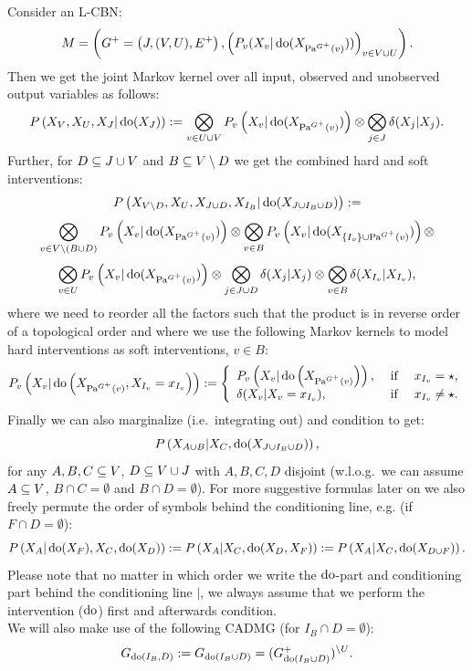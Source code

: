 \begin{Rem}[Recap]
    \label{rem-bcn-notation}
    Consider an L-CBN:
    \[M= \left ( G^+=\left ( J,(V,U),E^+ \right ), \left ( P_v ( X_v|\operatorname{do}( X_{\mathrm{Pa}^{G^+}(v)})) \right )_{v \in V \cup U} \right ).  \]
        Then we get the joint  Markov kernel over all input, observed and unobserved output variables as follows:
        \[ P\left ( X_V,X_U,X_J|\operatorname{do}(X_J) \right ) := \bigotimes_{v \in U \cup V} P_v\left ( X_v|\operatorname{do}(X_{\mathrm{Pa}^{G^+}(v)})\right ) \otimes 
        \bigotimes_{j \in J} \delta(X_j|X_j).\]
    Further, for $D \subseteq J \cup V$ and $B \subseteq V \setminus D$ we get the combined hard and soft interventions:
    \[ P\left ( X_{V \setminus D},X_U,X_{J \cup D},X_{I_B}| \operatorname{do}(X_{J \cup I_B \cup D}) \right ) :=\] 
    \[    \bigotimes_{v \in V \setminus (B \cup D)} P_v\left ( X_v|\operatorname{do}(X_{\mathrm{Pa}^{G^+}(v)})\right ) \otimes 
    \bigotimes_{v \in B} P_v\left ( X_v|\operatorname{do}(X_{\{I_v\}\cup\mathrm{Pa}^{G^+}(v)})\right ) \otimes \]
     \[   \bigotimes_{v \in U} P_v\left ( X_v|\operatorname{do}(X_{\mathrm{Pa}^{G^+}(v)})\right ) \otimes 
     \bigotimes_{j \in J \cup D} \delta(X_j|X_j) \otimes\bigotimes_{v \in B} \delta(X_{I_v}|X_{I_v})  ,\]
       where we need to reorder all the factors such that the product is in reverse order of a topological order and 
       where we use the following Markov kernels to model hard interventions as  soft interventions, $v\in B$: 
       \[ P_v\left ( X_v|\operatorname{do}\left ( X_{\mathrm{Pa}^{G^+}(v)},X_{I_v}=x_{I_v}\right )\right ) := 
         \left\{ \begin{array}{lll}
                 P_v\left ( X_v|\operatorname{do}\left ( X_{\mathrm{Pa}^{G^+}(v)}\right )\right ), & \text{ if } & x_{I_v} = \star, \\
    \delta(X_v|X_v =x_{I_v}),  & \text{ if } & x_{I_v} \neq \star. 
                \end{array}\right.\]
  Finally we can also marginalize (i.e.\ integrating out) and condition to get: 
  \[ P\left ( X_{A\cup B}|X_C, \operatorname{do}(X_{J \cup I_B \cup D}) \right ) ,\]
  for any $A,B,C \subseteq V$, $D \subseteq V \cup J$ with $A,B,C,D$ disjoint (w.l.o.g.\ we can assume $A \subseteq V$, $B \cap C = \emptyset$ and $B \cap D = \emptyset$).
For more suggestive formulas later on we also freely permute the order of symbols behind the conditioning line, e.g. (if $F \cap D = \emptyset$):
\[ P\left ( X_A|\operatorname{do}(X_F),X_C, \operatorname{do}(X_D) \right ) := P\left ( X_A|X_C, \operatorname{do}(X_D,X_F) \right ) := P\left ( X_A|X_C, \operatorname{do}(X_{D\cup F}) \right ).\]
Please note that no matter in which order we write the $\operatorname{do}$-part and conditioning part behind the conditioning line $|$, we always assume that we perform the intervention ($\operatorname{do}$) first and afterwards condition.\\
We will also make use of the following CADMG (for $I_B \cap D = \emptyset$):
  \[ G_{\operatorname{do}(I_B,D)} := G_{\operatorname{do}(I_B\cup D)} = (G^+_{\operatorname{do}(I_B \cup D)})^{\setminus U}.  \]
\end{Rem}




